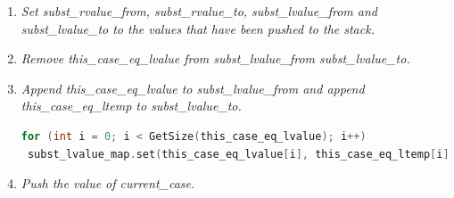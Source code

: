 \documentclass[11pt]{report}
\begin{document}
\begin{enumerate}

\item \textit{Set subst\_rvalue\_from, subst\_rvalue\_to, subst\_lvalue\_from and subst\_lvalue\_to to the values that have been pushed to the stack.}
\item \textit{Remove this\_case\_eq\_lvalue from subst\_lvalue\_from subst\_lvalue\_to.}

\item \textit{Append this\_case\_eq\_lvalue to subst\_lvalue\_from and append this\_case\_eq\_ltemp to subst\_lvalue\_to.}
\begin{lstlisting}[language=C++]
for (int i = 0; i < GetSize(this_case_eq_lvalue); i++)
 subst_lvalue_map.set(this_case_eq_lvalue[i], this_case_eq_ltemp[i]);
\end{lstlisting}


\item \textit{Push the value of current\_case.}



\end{enumerate}
\end{document}
